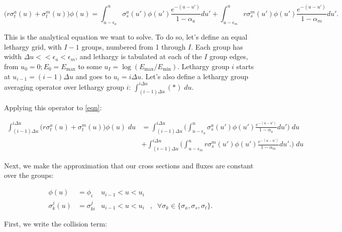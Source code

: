 \documentclass{article}
\begin{document}
        \begin{equation}
            \big(r \sigma_t^a(u) + \sigma_t^m(u) \big)  \phi(u) = 
            \int_{u - \epsilon_a}^{u} \sigma_s^a(u')\phi(u') \frac{e^{-(u-u')}}{1 - \alpha_a}du'  + 
            \int_{u - \epsilon_m}^{u} r \sigma_s^m(u')\phi(u') \frac{e^{-(u-u')}}{1 - \alpha_m}du'. \label{eqn}
        \end{equation}

        This is the analytical equation we want to solve. 
        To do so, let's define an equal lethargy grid, with $I-1$ groups, 
        numbered from 1 through $I$. 
        Each group has width $\Delta u << \epsilon_a < \epsilon_m$, 
        and lethargy is tabulated at each of the $I$ group edges,
        from $u_0 = 0; E_0 = E_\text{max}$
        to some $u_I  = \log{(E_\text{max}/E_\text{min})}$. 
        Lethargy group $i$ starts at $u_{i-1} = (i-1) \Delta u$ and goes to $u_i = i \Delta u$.
        Let's also define a lethargy group averaging operator over lethargy group $i$: 
        $\int_{(i-1)\Delta u}^{i \Delta u} (*) \; du$. 

        Applying this operator to \ref{eqn}:

         \begin{align}
            \int_{(i-1)\Delta u}^{i \Delta u} 
            \big(r \sigma_t^a(u) + \sigma_t^m(u) \big)  \phi(u) \; du &= 
            \int_{(i-1)\Delta u}^{i \Delta u} 
            \bigg(  
            \int_{u - \epsilon_a}^{u} \sigma_s^a(u')\phi(u') \frac{e^{-(u-u')}}{1 - \alpha_a}du'  
            \bigg)  \; du \\ &+ 
            \int_{(i-1)\Delta u}^{i \Delta u} 
            \bigg(  
            \int_{u - \epsilon_m}^{u} r \sigma_s^m(u')\phi(u') \frac{e^{-(u-u')}}{1 - \alpha_m}du'.
            \bigg)  \; du 
         \end{align}

         Next, we make the approximation that our cross sections and fluxes are constant over the groups:

         \begin{align}
             \phi(u) &= \phi_i & u_{i-1} < u < u_i &               \; \; \\
             \sigma_k^j(u) &= \sigma_{ki}^j & u_{i-1} < u < u_i &,  \; \;  
             \forall \sigma_k \in \{\sigma_a,\sigma_s,\sigma_t\}. 
         \end{align}

         First, we write the collision term:
\end{document}
